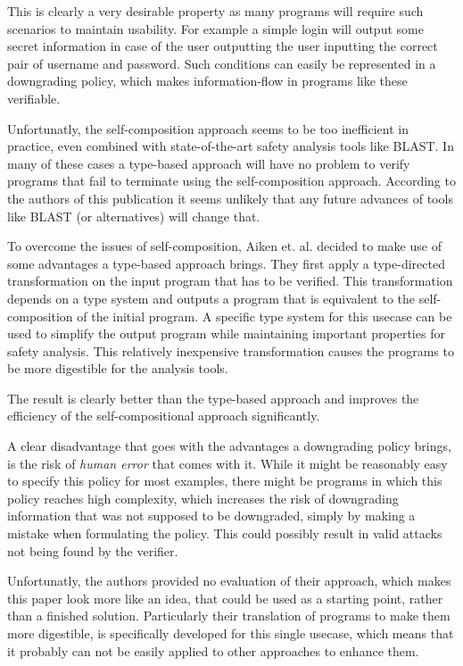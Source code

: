 \documentclass[a4paper,UKenglish]{lipics-v2018}
\begin{document}
This is clearly a very desirable property as many programs will require such scenarios to maintain usability. For example a simple login will output some secret information in case of the user outputting the user inputting the correct pair of username and password. Such conditions can easily be represented in a downgrading policy, which makes information-flow in programs like these verifiable.\cite{secure_information_flow_safety}

Unfortunatly, the self-composition approach seems to be too inefficient in practice, even combined with state-of-the-art safety analysis tools like BLAST. In many of these cases a type-based approach will have no problem to verify programs that fail to terminate using the self-composition approach. According to the authors of this publication it seems unlikely that any future advances of tools like BLAST (or alternatives) will change that.\cite{secure_information_flow_safety}

To overcome the issues of self-composition, Aiken et. al. decided to make use of some advantages a type-based approach brings. They first apply a type-directed transformation on the input program that has to be verified. This transformation depends on a type system and outputs a program that is equivalent to the self-composition of the initial program. A specific type system for this usecase can be used to simplify the output program while maintaining important properties for safety analysis. This relatively inexpensive transformation causes the programs to be more digestible for the analysis tools. 
\cite{secure_information_flow_safety}

The result is clearly better than the type-based approach and improves the efficiency of the self-compositional approach significantly.
\cite{secure_information_flow_safety}

A clear disadvantage that goes with the advantages a downgrading policy brings, is the risk of \textit{human error} that comes with it. While it might be reasonably easy to specify this policy for most examples, there might be programs in which this policy reaches high complexity, which increases the risk of downgrading information that was not supposed to be downgraded, simply by making a mistake when formulating the policy. This could possibly result in valid attacks not being found by the verifier.

Unfortunatly, the authors provided no evaluation of their approach, which makes this paper look more like an idea, that could be used as a starting point, rather than a finished solution. Particularly their translation of programs to make them more digestible, is specifically developed for this single usecase, which means that it probably can not be easily applied to other approaches to enhance them.
\end{document}
